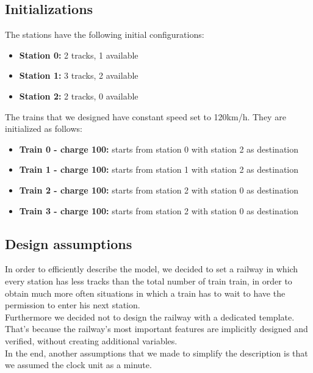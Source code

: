 \subsection{Initializations}
The stations have the following initial configurations:
\begin{itemize}
    \item \textbf{Station 0: } 2 tracks, 1 available
    \item \textbf{Station 1: } 3 tracks, 2 available
    \item \textbf{Station 2: } 2 tracks, 0 available
\end{itemize}
\newpage

The trains that we designed have constant speed set to 120km/h. They are initialized as follows:
\begin{itemize}
    \item \textbf{Train 0 - charge 100: } starts from station 0 with station 2 as destination
    \item \textbf{Train 1 - charge 100: } starts from station 1 with station 2 as destination
    \item \textbf{Train 2 - charge 100: } starts from station 2 with station 0 as destination
    \item \textbf{Train 3 - charge 100: } starts from station 2 with station 0 as destination
\end{itemize}
\bigskip

\subsection{Design assumptions}
In order to efficiently describe the model, we decided to set a railway in which every station has less tracks than the total
number of train train, in order to obtain much more often situations in which a train has to wait to have the permission to enter
his next station.\\
Furthermore we decided not to design the railway with a dedicated template. That's because the railway's most important features are
implicitly designed and verified, without creating additional variables.\\
In the end, another assumptions that we made to simplify the description is that we assumed the clock unit as a minute.
